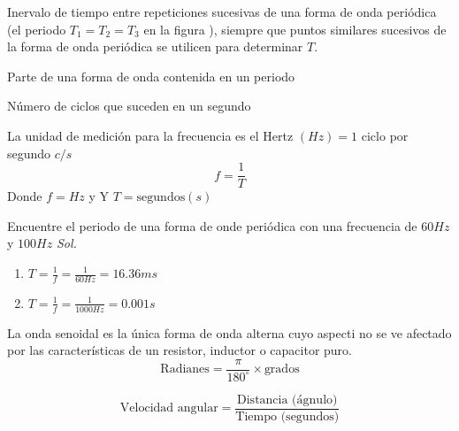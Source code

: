 \begin{definition}[Periodo $T$]
	Inervalo de tiempo entre repeticiones sucesivas de una forma de onda periódica (el periodo $T_{1}=T_{2}=T_{3}$ en la figura ), siempre que puntos similares sucesivos de la forma de onda periódica se utilicen para determinar $T$.
\end{definition}

\begin{definition}[Ciclo]
	Parte de una forma de onda contenida en un periodo
\end{definition}

\begin{definition}[Frecuencia ($f$)]
	Número de ciclos que suceden en un segundo
\end{definition}
La unidad de medición para la frecuencia es el Hertz $(Hz)=1$ ciclo por segundo $c/s$
\begin{equation}
	f=\frac{1}{T}
\end{equation}
Donde $f=Hz$ y Y $T=\text{segundos}(s)$

\begin{example}
	Encuentre el periodo de una forma de onde periódica con una frecuencia de 60$Hz$ y $100Hz$
	\textit{ Sol. }

	\begin{enumerate}
		\item $T=\frac{1}{f}=\frac{1}{60Hz}=16.36ms$
		\item $T=\frac{1}{f}=\frac{1}{1000Hz}=0.001s$
	\end{enumerate}
\end{example}

La onda senoidal es la única forma de onda alterna cuyo aspecti no se ve afectado por las características de un resistor, inductor o capacitor puro.
\begin{equation}
	\text{Radianes}= \frac{\pi}{180^{\circ}}\times \text{grados}
\end{equation}

\begin{equation}
	\text{Velocidad angular}= \frac{\text{Distancia (ágnulo)}}{\text{Tiempo (segundos)}}
\end{equation}




\begin{definition}

\end{definition}

